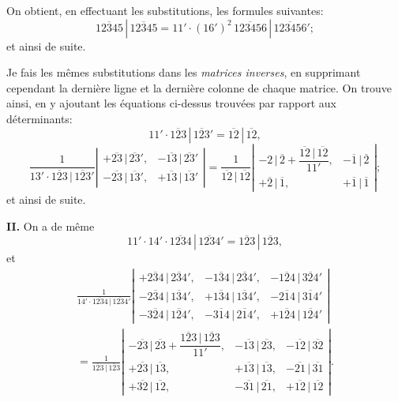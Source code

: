 \documentclass[11pt,a4paper]{book}
\begin{document}
\medskip

On obtient, en effectuant les substitutions, les formules suivantes:
\[
\overline{12345}\,|\,\overline{12345}
= 11' \cdot (16')^2\,\overline{123456}\,|\,\overline{123456}';
\]
et ainsi de suite.

\medskip

Je fais les m\^emes substitutions dans les \textit{matrices inverses}, en
supprimant cependant la derni\`ere ligne et la derni\`ere colonne de chaque
matrice. On trouve ainsi, en y ajoutant les \'equations ci-dessus trouv\'ees
par rapport aux d\'eterminants:
\[
11' \cdot \overline{123}\,|\,\overline{123}'
= \overline{12}\,|\,\overline{12},
\]
\[
\frac{1}{13' \cdot \overline{123}\,|\,\overline{123}'}
\left|
\begin{array}{cc}
+\overline{23}\,|\,\overline{23}', & -\overline{13}\,|\,\overline{23}' \\
-\overline{23}\,|\,\overline{13}', & +\overline{13}\,|\,\overline{13}'
\end{array}
\right|
=
\frac{1}{\overline{12}\,|\,\overline{12}}
\left|
\begin{array}{cc}
-2\,|\,\overline{2} + \dfrac{\overline{12}\,|\,\overline{12}}{11'}, &
-\overline{1}\,|\,\overline{2} \\
+\overline{2}\,|\,\overline{1}, & +\overline{1}\,|\,\overline{1}
\end{array}
\right|;
\]
et ainsi de suite.

\medskip

\textbf{II.} On a de m\^eme
\[
11' \cdot 14' \cdot \overline{1234}\,|\,\overline{1234}'
= \overline{123}\,|\,\overline{123},
\]
et
\begin{multline*}
\frac{1}{14' \cdot \overline{1234}\,|\,\overline{1234}'}
\left|
\begin{array}{ccc}
+\overline{234}\,|\,\overline{234}', & -\overline{134}\,|\,\overline{234}', &
-\overline{124}\,|\,\overline{324}' \\
-\overline{234}\,|\,\overline{134}', & +\overline{134}\,|\,\overline{134}', &
-\overline{214}\,|\,\overline{314}' \\
-\overline{324}\,|\,\overline{124}', & -\overline{314}\,|\,\overline{214}', &
+\overline{124}\,|\,\overline{124}'
\end{array}
\right| \\
=
\frac{1}{\overline{123}\,|\,\overline{123}}
\left|
\begin{array}{ccc}
-\overline{23}\,|\,\overline{23} + \dfrac{\overline{123}\,|\,\overline{123}}{11'}, &
-\overline{13}\,|\,\overline{23}, & -\overline{12}\,|\,\overline{32} \\
+\overline{23}\,|\,\overline{13}, & +\overline{13}\,|\,\overline{13}, &
-\overline{21}\,|\,\overline{31} \\
+\overline{32}\,|\,\overline{12}, & -\overline{31}\,|\,\overline{21}, &
+\overline{12}\,|\,\overline{12}
\end{array}
\right|.
\end{multline*}
\end{document}
